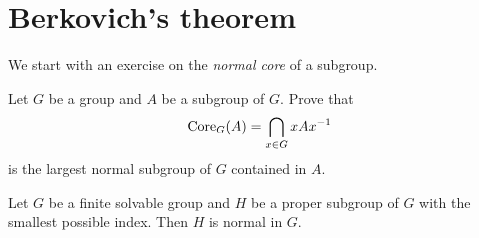 \section{Berkovich's theorem}

We start with an exercise on the \emph{normal core} of a subgroup. 

\begin{exercise}
\label{xca:core}
	Let $G$ be a group and $A$ be a subgroup of $G$. Prove that
	\[
    \operatorname{Core}_{G}(A)=\bigcap_{x\in G}xAx^{-1}
    \]
    is the largest normal subgroup of $G$ contained in $A$. 
\end{exercise}



\begin{theorem}[Berkovich]
\label{thm:Berkovich}
Let $G$ be a finite solvable group and $H$ be a proper subgroup of $G$ with
the smallest possible index. Then $H$ is normal in $G$. 
\end{theorem}

